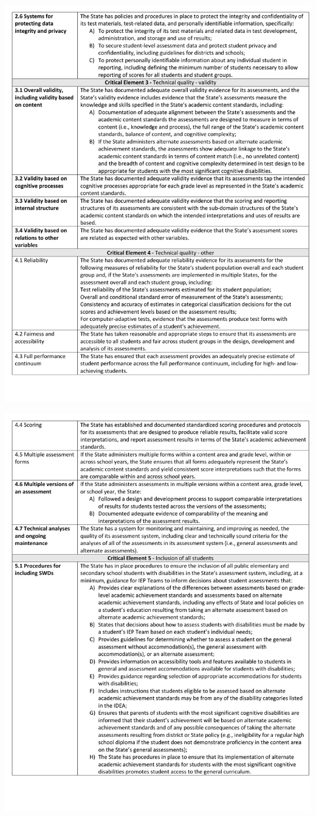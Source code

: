 \documentclass[]{book}
\begin{document}
\newpage

\includegraphics{figures/peer_rev/PeerReview3.pdf}

\newpage

\includegraphics{figures/peer_rev/PeerReview4.pdf}
\end{document}
